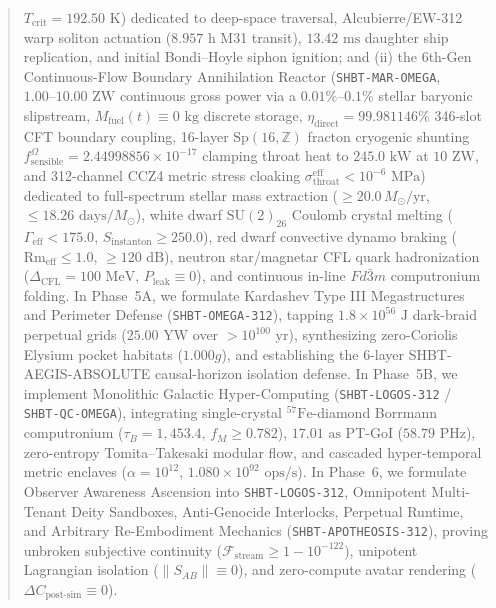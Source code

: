 \documentclass[11pt,onecolumn]{article}
\begin{document}
\begin{abstract}
$T_{\text{crit}} = 192.50\text{ K}$) dedicated to deep-space traversal, Alcubierre/EW-312 warp soliton actuation ($8.957\text{ h}$ M31 transit), $13.42\text{ ms}$ daughter ship replication, and initial Bondi--Hoyle siphon ignition; and (ii) the 6th-Gen Continuous-Flow Boundary Annihilation Reactor (\texttt{SHBT-MAR-OMEGA}, $1.00\text{--}10.00\text{ ZW}$ continuous gross power via a $0.01\%\text{--}0.1\%$ stellar baryonic slipstream, $M_{\text{fuel}}(t) \equiv 0\text{ kg}$ discrete storage, $\eta_{\text{direct}} = 99.981146\%$ 346-slot CFT boundary coupling, 16-layer $\text{Sp}(16,\mathbb{Z})$ fracton cryogenic shunting $f_{\text{sensible}}^\Omega = 2.44998856 \times 10^{-17}$ clamping throat heat to $245.0\text{ kW}$ at $10\text{ ZW}$, and 312-channel CCZ4 metric stress cloaking $\sigma_{\text{throat}}^{\text{eff}} < 10^{-6}\text{ MPa}$) dedicated to full-spectrum stellar mass extraction ($\ge 20.0\,M_\odot/\text{yr}$, $\le 18.26\text{ days}/M_\odot$), white dwarf $\text{SU}(2)_{26}$ Coulomb crystal melting ($\Gamma_{\text{eff}} < 175.0$, $S_{\text{instanton}} \ge 250.0$), red dwarf convective dynamo braking ($\text{Rm}_{\text{eff}} \le 1.0$, $\ge 120\text{ dB}$), neutron star/magnetar CFL quark hadronization ($\Delta_{\text{CFL}} = 100\text{ MeV}$, $P_{\text{leak}} \equiv 0$), and continuous in-line $Fd\bar{3}m$ computronium folding. In Phase~5A, we formulate Kardashev Type III Megastructures and Perimeter Defense (\texttt{SHBT-OMEGA-312}), tapping $1.8 \times 10^{56}\text{ J}$ dark-braid perpetual grids ($25.00\text{ YW}$ over $>10^{100}\text{ yr}$), synthesizing zero-Coriolis Elysium pocket habitats ($1.000g$), and establishing the 6-layer SHBT-AEGIS-ABSOLUTE causal-horizon isolation defense. In Phase~5B, we implement Monolithic Galactic Hyper-Computing (\texttt{SHBT-LOGOS-312} / \texttt{SHBT-QC-OMEGA}), integrating single-crystal $^{57}\text{Fe}$-diamond Borrmann computronium ($\tau_B = 1{,}453.4$, $f_M \ge 0.782$), $17.01\text{ as}$ PT-GoI ($58.79\text{ PHz}$), zero-entropy Tomita--Takesaki modular flow, and cascaded hyper-temporal metric enclaves ($\alpha = 10^{12}$, $1.080 \times 10^{92}\text{ ops/s}$). In Phase~6, we formulate Observer Awareness Ascension into \texttt{SHBT-LOGOS-312}, Omnipotent Multi-Tenant Deity Sandboxes, Anti-Genocide Interlocks, Perpetual Runtime, and Arbitrary Re-Embodiment Mechanics (\texttt{SHBT-APOTHEOSIS-312}), proving unbroken subjective continuity ($\mathcal{F}_{\text{stream}} \ge 1 - 10^{-122}$), unipotent Lagrangian isolation ($\|S_{AB}\| \equiv 0$), and zero-compute avatar rendering ($\Delta C_{\text{post-sim}} \equiv 0$).
\end{abstract}
\end{document}
